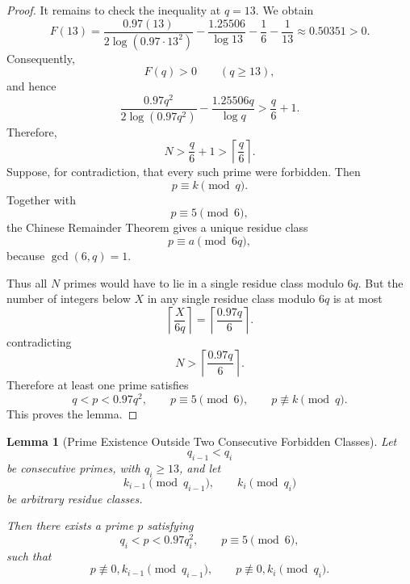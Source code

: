 \documentclass[11pt,a4paper]{article}
\newtheorem{lemma}[theorem]{Lemma}
\theoremstyle{definition}
\theoremstyle{remark}
\begin{document}
\begin{proof}
It remains to check the inequality at \(q=13\). We obtain
\[
F(13)
=
\frac{0.97(13)}
{2\log(0.97\cdot13^2)}
-\frac{1.25506}{\log13}
-\frac16-\frac1{13}
\approx0.50351>0.
\]
Consequently,
\[
F(q)>0
\qquad(q\ge13),
\]
and hence
\[
\frac{0.97q^2}
{2\log(0.97q^2)}
-\frac{1.25506q}{\log q}
>
\frac q6+1.
\]
Therefore,
\[
N>\frac q6+1
>
\left\lceil\frac q6\right\rceil.
\]
Suppose, for contradiction, that every such prime were forbidden. Then
\[
p\equiv k\pmod q.
\]
Together with
\[
p\equiv5\pmod6,
\]
the Chinese Remainder Theorem gives a unique residue class
\[
p\equiv a\pmod{6q},
\]
because \(\gcd(6,q)=1\).


Thus all $N$ primes would have to lie in a single residue class modulo
$6q$. But the number of integers below $X$ in any single residue class
modulo $6q$ is at most
\[
\left\lceil\frac{X}{6q}\right\rceil
=
\left\lceil\frac{0.97q}{6}\right\rceil.
\]
contradicting
\[
N>
\left\lceil\frac{0.97q}{6}\right\rceil.
\]
Therefore at least one prime satisfies
\[
q<p<0.97q^2,\qquad
p\equiv5\pmod6,\qquad
p\not\equiv k\pmod q.
\]
This proves the lemma.
\end{proof}

\begin{lemma}[Prime Existence Outside Two Consecutive Forbidden Classes]
Let
\[
q_{i-1}<q_i
\]
be consecutive primes, with \(q_i\ge13\), and let
\[
k_{i-1}\pmod{q_{i-1}},
\qquad
k_i\pmod{q_i}
\]
be arbitrary residue classes.

Then there exists a prime \(p\) satisfying
\[
\boxed{
q_i<p<0.97q_i^2,
\qquad
p\equiv5\pmod6,
}
\]
such that
\[
\boxed{
p\not\equiv 0,k_{i-1}\pmod{q_{i-1}},
\qquad
p\not\equiv 0,k_i\pmod{q_i}.
}
\]
\end{lemma}
\end{document}
